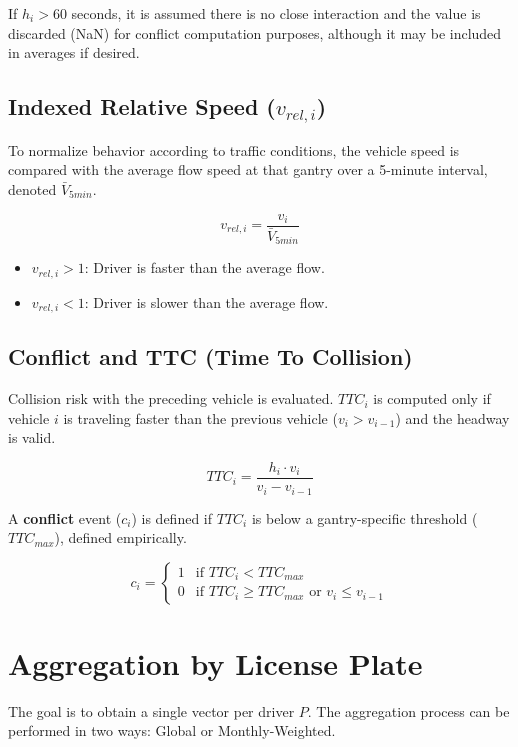 If $h_i > 60$ seconds, it is assumed there is no close interaction and the value is discarded (NaN) for conflict computation purposes, although it may be included in averages if desired.

\subsection{Indexed Relative Speed ($v_{rel, i}$)}
To normalize behavior according to traffic conditions, the vehicle speed is compared with the average flow speed at that gantry over a 5-minute interval, denoted $\bar{V}_{5min}$.

\begin{equation}
    v_{rel, i} = \frac{v_i}{\bar{V}_{5min}}
\end{equation}

\begin{itemize}
    \item $v_{rel, i} > 1$: Driver is faster than the average flow.
    \item $v_{rel, i} < 1$: Driver is slower than the average flow.
\end{itemize}

\subsection{Conflict and TTC (Time To Collision)}
Collision risk with the preceding vehicle is evaluated. $TTC_i$ is computed only if vehicle $i$ is traveling faster than the previous vehicle ($v_i > v_{i-1}$) and the headway is valid.

\begin{equation}
    TTC_i = \frac{h_i \cdot v_i}{v_i - v_{i-1}}
\end{equation}

A \textbf{conflict} event ($c_i$) is defined if $TTC_i$ is below a gantry-specific threshold ($TTC_{max}$), defined empirically.

\begin{equation}
    c_i = \begin{cases} 
    1 & \text{if } TTC_i < TTC_{max} \\
    0 & \text{if } TTC_i \ge TTC_{max} \text{ or } v_i \le v_{i-1}
    \end{cases}
\end{equation}

\section{Aggregation by License Plate}
The goal is to obtain a single vector per driver $P$. The aggregation process can be performed in two ways: Global or Monthly-Weighted.

